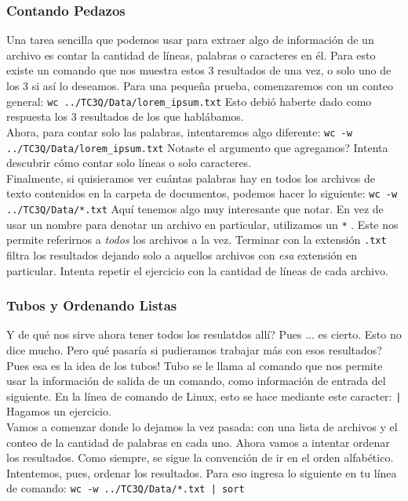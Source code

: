 \documentclass[10pt,letterpaper]{article}
\newcommand{\inlinecode}[1]{
\colorbox{light-gray}{\texttt{#1}}
}
\begin{document}
\subsubsection{Contando Pedazos}
Una tarea sencilla que podemos usar para extraer algo de informaci\'on de un archivo es contar la cantidad de l\'ineas, palabras o caracteres en \'el. Para esto existe un comando que nos muestra estos 3 resultados de una vez, o solo uno de los 3 si as\'i lo deseamos. Para una peque\~na prueba, comenzaremos con un conteo general: \inlinecode{wc ../TC3Q/Data/lorem\_ipsum.txt} Esto debi\'o haberte dado como respuesta los 3 resultados de los que habl\'abamos.\\

Ahora, para contar solo las palabras, intentaremos algo diferente: \inlinecode{wc -w ../TC3Q/Data/lorem\_ipsum.txt} Notaste el argumento que agregamos? Intenta descubrir c\'omo contar solo l\'ineas o solo caracteres.\\

Finalmente, si quisieramos ver cu\'antas palabras hay en todos los archivos de texto contenidos en la carpeta de documentos, podemos hacer lo siguiente: \inlinecode{wc -w ../TC3Q/Data/*.txt} Aqu\'i tenemos algo muy interesante que notar. En vez de usar un nombre para denotar un archivo en particular, utilizamos un \inlinecode{*}. Este nos permite referirnos a \emph{todos} los archivos a la vez. Terminar con la extensi\'on \inlinecode{.txt} filtra los resultados dejando solo a aquellos archivos con \emph{esa} extensi\'on en particular. Intenta repetir el ejercicio con la cantidad de l\'ineas de cada archivo.

\subsubsection{Tubos y Ordenando Listas}
Y de qu\'e nos sirve ahora tener todos los resulatdos all\'i? Pues ... es cierto. Esto no dice mucho. Pero qu\'e pasar\'ia si pudieramos trabajar m\'as con esos resultados? Pues esa es la idea de los tubos! Tubo se le llama al comando que nos permite usar la informaci\'on de salida de un comando, como informaci\'on de entrada del siguiente. En la l\'inea de comando de Linux, esto se hace mediante este caracter: \inlinecode{|} Hagamos un ejercicio.\\

Vamos a comenzar donde lo dejamos la vez pasada: con una lista de archivos y el conteo de la cantidad de palabras en cada uno. Ahora vamos a intentar ordenar los resultados. Como siempre, se sigue la convenci\'on de ir en el orden alfab\'etico. Intentemos, pues, ordenar los resultados. Para eso ingresa lo siguiente en tu l\'inea de comando: \inlinecode{wc -w ../TC3Q/Data/*.txt | sort}\\
\end{document}
